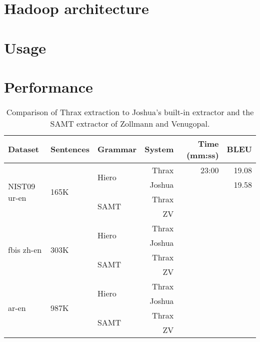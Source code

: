 \documentclass{pbml}
\begin{document}
\section{Hadoop architecture}
\label{sec:hadoop}

\section{Usage}
\label{sec:usage}

\section{Performance}
\label{sec:performance}

\begin{table}[t]
\caption{Comparison of Thrax extraction to Joshua's built-in extractor and the SAMT extractor of Zollmann and Venugopal.}
\begin{tabular}{l | l | l | r | r | r}
Dataset & Sentences & Grammar & System & Time (mm:ss) & BLEU \\ \hline
\multirow{4}{*}{NIST09 ur-en} & \multirow{4}{*}{165K} & \multirow{2}{*}{Hiero} & Thrax & 23:00 & 19.08 \\
& & & Joshua & & 19.58 \\
& & \multirow{2}{*}{SAMT} & Thrax & & \\
& & & ZV & & \\ \hline
\multirow{4}{*}{fbis zh-en} & \multirow{4}{*}{303K} & \multirow{2}{*}{Hiero} & Thrax & & \\
& & & Joshua & & \\
& & \multirow{2}{*}{SAMT} & Thrax & & \\
& & & ZV & & \\ \hline
\multirow{4}{*}{ar-en} & \multirow{4}{*}{987K} & \multirow{2}{*}{Hiero} & Thrax & & \\
& & & Joshua & & \\
& & \multirow{2}{*}{SAMT} & Thrax & & \\
& & & ZV & & \\ \hline

\end{tabular}
\end{table}


\end{document}
